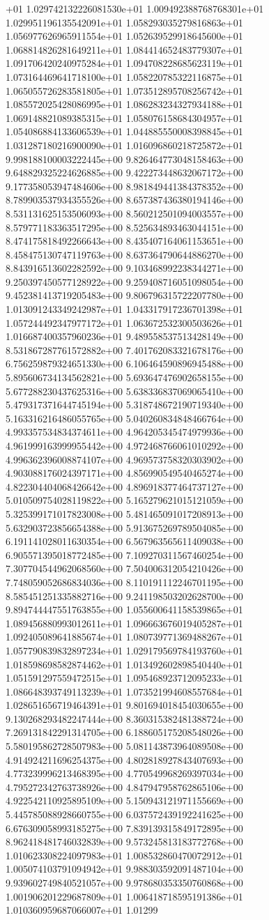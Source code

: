+01	1.029742132226081530e+01	1.009492388768768301e+01	1.029951196135542091e+01	1.058293035279816863e+01	1.056977626965911554e+01	1.052639529918645600e+01	1.068814826281649211e+01	1.084414652483779307e+01	1.091706420240975284e+01	1.094708228685623119e+01	1.073164469641718100e+01	1.058220785322116875e+01	1.065055726283581805e+01	1.073512895708256742e+01	1.085572025428086995e+01	1.086283234327934188e+01	1.069148821089385315e+01	1.058076158684304957e+01	1.054086884133606539e+01	1.044885550008398845e+01	1.031287180216900090e+01	1.016096860218725872e+01	9.998188100003222445e+00	9.826464773048158463e+00	9.648829325224626885e+00	9.422273448632067172e+00	9.177358053947484606e+00	8.981849441384378352e+00	8.789903537934355526e+00	8.657387436380194146e+00	8.531131625153506093e+00	8.560212501094003557e+00	8.579771183363517295e+00	8.525634893463044151e+00	8.474175818492266643e+00	8.435407164061153651e+00	8.458475130747119763e+00	8.637364790644886270e+00	8.843916513602282592e+00	9.103468992238344271e+00	9.250397450577128922e+00	9.259408716051098054e+00	9.452381413719205483e+00	9.806796315722207780e+00	1.013091243349242987e+01	1.043317917236701398e+01	1.057244492347977172e+01	1.063672532300503626e+01	1.016687400357960236e+01	9.489558537513428149e+00	8.531867287761572882e+00	7.401762083321678176e+00	6.756259879324651330e+00	6.106464590896945488e+00	5.895606734134562821e+00	5.693647476902658155e+00	5.677288230437625316e+00	5.638336837069065410e+00	5.479317371644745194e+00	5.318748672190719340e+00	5.163316216486055765e+00	5.040260834848466764e+00	4.993357534834374611e+00	4.964205345474979936e+00	4.961999163999955442e+00	4.972468766061010292e+00	4.996362396008874107e+00	4.969573758320303902e+00	4.903088176024397171e+00	4.856990549540465274e+00	4.822304404068426642e+00	4.896918377464737127e+00	5.010509754028119822e+00	5.165279621015121059e+00	5.325399171017823008e+00	5.481465091017208913e+00	5.632903723856654388e+00	5.913675269789504085e+00	6.191141028011630354e+00	6.567963565611409038e+00	6.905571395018772485e+00	7.109270311567460254e+00	7.307704544962068560e+00	7.504006312054210426e+00	7.748059052686834036e+00	8.110191112246701195e+00	8.585451251335882716e+00	9.241198503202628700e+00	9.894744447551763855e+00	1.055600641158539865e+01	1.089456880993012611e+01	1.096663676019405287e+01	1.092405089641885674e+01	1.080739771369488267e+01	1.057790839832897234e+01	1.029179569784193760e+01	1.018598698582874462e+01	1.013492602898540440e+01	1.051591297559472515e+01	1.095468923712095233e+01	1.086648393749113239e+01	1.073521994608557684e+01	1.028651656719464391e+01	9.801694018454030655e+00	9.130268293482247444e+00	8.360315382481388724e+00	7.269131842291314705e+00	6.188605175208548026e+00	5.580195862728507983e+00	5.081143873964089508e+00	4.914924211696254375e+00	4.802818927843407693e+00	4.773239996213468395e+00	4.770549968269397034e+00	4.795272342763738926e+00	4.847947958762865106e+00	4.922542110925895109e+00	5.150943121971155669e+00	5.445785088928660755e+00	6.037572439192241625e+00	6.676309058993185275e+00	7.839139315849172895e+00	8.962418481746032839e+00	9.573245813183772768e+00	1.010623308224097983e+01	1.008532860470072912e+01	1.005074103791094942e+01	9.988303592091487104e+00	9.939602749840521057e+00	9.978680353350760868e+00	1.001906201229687809e+01	1.006418718595191386e+01	1.010360959687066007e+01	1.01299